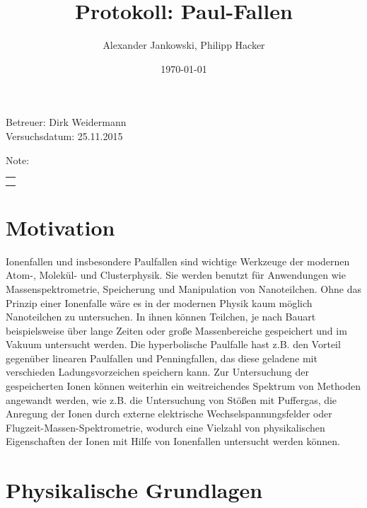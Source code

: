 \documentclass[numbers=noenddot,a4paper,notitlepage,twoside,BCOR15mm]{scrartcl}
\title{Protokoll: Paul-Fallen} %
\author{Alexander Jankowski, Philipp Hacker}
\date{\today}
\begin{document}
	\maketitle
	\begin{center}
		Betreuer: Dirk Weidermann \\ %
		Versuchsdatum: 25.11.2015\\ %
		\begin{table}[h]
			\centering
			Note: %
			\begin{tabularx}{1.5cm}{|X|}
				\hline \\ \\
				\hline
			\end{tabularx}
		\end{table}
	\end{center}
	\vspace*{\fill}
	\tableofcontents
	\vfill
	\newpage
	\section{Motivation}
	Ionenfallen und insbesondere Paulfallen sind wichtige Werkzeuge der modernen Atom-, Molekül- und Clusterphysik. Sie werden benutzt für Anwendungen wie Massenspektrometrie, Speicherung und Manipulation von Nanoteilchen. Ohne das Prinzip einer Ionenfalle wäre es in der modernen Physik kaum möglich Nanoteilchen zu untersuchen. In ihnen können Teilchen, je nach Bauart beispielsweise über lange Zeiten oder große Massenbereiche gespeichert und im Vakuum untersucht werden. Die hyperbolische Paulfalle hast z.B. den Vorteil gegenüber linearen Paulfallen und Penningfallen, das diese geladene mit verschieden Ladungsvorzeichen speichern kann. Zur Untersuchung der gespeicherten Ionen können weiterhin ein weitreichendes Spektrum von Methoden angewandt werden, wie z.B. die Untersuchung von Stößen mit Puffergas, die Anregung der Ionen durch externe elektrische Wechselspannungsfelder oder Flugzeit-Massen-Spektrometrie, wodurch eine Vielzahl von physikalischen Eigenschaften der Ionen mit Hilfe von Ionenfallen untersucht werden können.
	\newpage
	\section{Physikalische Grundlagen}
	
\end{document}
